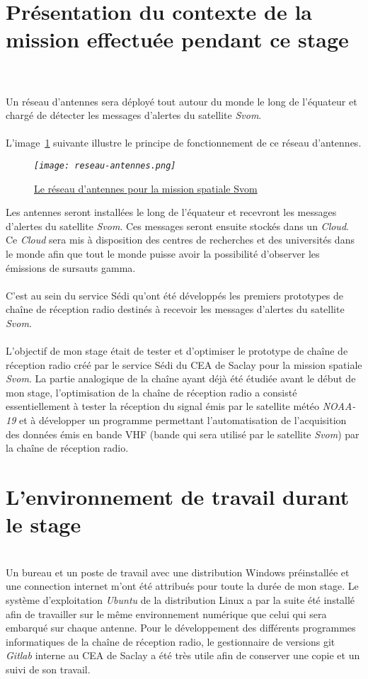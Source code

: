 \documentclass[12pt,fleqn]{book} %
\begin{document}
\section{Présentation du contexte de la mission effectuée pendant ce stage}
~\\\\Un réseau d'antennes sera déployé tout autour du monde le long de l'équateur et chargé de détecter les messages d'alertes du satellite \emph{Svom}.
~\\\\L'image~\underline{\color{blue}\ref{reseau-antennes}} suivante illustre le principe de fonctionnement de ce réseau d'antennes.
\begin{figure}[H]
	\centering
	\itshape
	\texttt{[image: reseau-antennes.png]}
	\caption{\label{reseau-antennes} \underline{Le réseau d'antennes pour la mission spatiale Svom}}
\end{figure}
\noindent Les antennes seront installées le long de l'équateur et recevront les messages d'alertes du satellite \emph{Svom}. Ces messages seront ensuite stockés dans un \emph{Cloud}. Ce \emph{Cloud} sera mis à disposition des centres de recherches et des universités dans le monde afin que tout le monde puisse avoir la possibilité d'observer les émissions de sursauts gamma.
~\\\\C'est au sein du service Sédi qu'ont été développés les premiers prototypes de chaîne de réception radio destinés à recevoir les messages d'alertes du satellite \emph{Svom}.
~\\\\L'objectif de mon stage était de tester et d'optimiser le prototype de chaîne de réception radio créé par le service Sédi du CEA de Saclay pour la mission spatiale \emph{Svom}. La partie analogique de la chaîne ayant déjà été étudiée avant le début de mon stage, l'optimisation de la chaîne de réception radio a consisté essentiellement à tester la réception du signal émis par le satellite météo \emph{NOAA-19} et à développer un programme permettant l'automatisation de l'acquisition des données émis en bande VHF (bande qui sera utilisé par le satellite \emph{Svom}) par la chaîne de réception radio. 
\section{L'environnement de travail durant le stage}
~\\\indent Un bureau et un poste de travail avec une distribution Windows préinstallée et une connection internet m'ont été attribués pour toute la durée de mon stage. Le système d'exploitation \emph{Ubuntu} de la distribution Linux a par la suite été installé afin de travailler sur le même environnement numérique que celui qui sera embarqué sur chaque antenne. Pour le développement des différents programmes informatiques de la chaîne de réception radio, le gestionnaire de versions git \emph{Gitlab} interne au CEA de Saclay a été très utile afin de conserver une copie et un suivi de son travail.
\end{document}
